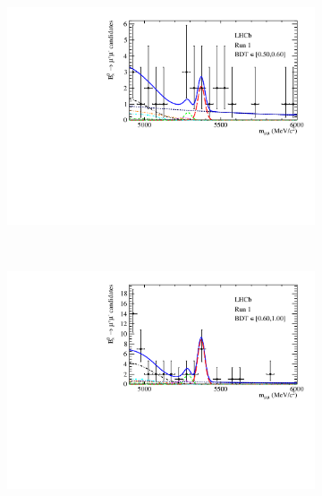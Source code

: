 {{\begin{figure}[htbp]
\begin{subfigure}[b]{0.48\textwidth}
    \end{subfigure}
    \begin{subfigure}[b]{0.48\textwidth}
        \includegraphics[width=\textwidth]{./Figs/BFAnalysis/Bsmumu_Fit_Run1_bin4.pdf}
    \end{subfigure}
    ~ %
    \begin{subfigure}[b]{0.48\textwidth}
       \includegraphics[width=\textwidth]{./Figs/BFAnalysis/Bsmumu_Fit_Run1_bin5.pdf}
    \end{subfigure}

    \qquad


\end{figure}}}
